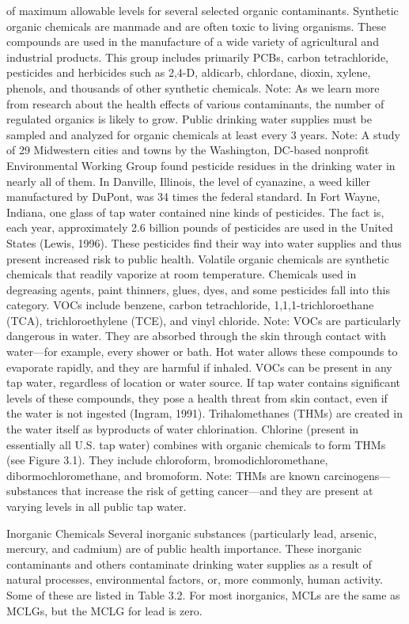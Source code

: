 \documentclass{article}
\begin{document}
of maximum allowable levels for several selected organic contaminants.
Synthetic organic chemicals are manmade and are often toxic to living
organisms. These compounds are used in the manufacture of a wide variety
of agricultural and industrial products. This group includes primarily
PCBs, carbon tetrachloride, pesticides and herbicides such as 2,4-D,
aldicarb, chlordane, dioxin, xylene, phenols, and thousands of other
synthetic chemicals. Note: As we learn more from research about the
health effects of various contaminants, the number of regulated organics
is likely to grow. Public drinking water supplies must be sampled and
analyzed for organic chemicals at least every 3 years. Note: A study of
29 Midwestern cities and towns by the Washington, DC-based nonprofit
Environmental Working Group found pesticide residues in the drinking
water in nearly all of them. In Danville, Illinois, the level of
cyanazine, a weed killer manufactured by DuPont, was 34 times the
federal standard. In Fort Wayne, Indiana, one glass of tap water
contained nine kinds of pesticides. The fact is, each year,
approximately 2.6 billion pounds of pesticides are used in the United
States (Lewis, 1996). These pesticides find their way into water
supplies and thus present increased risk to public health. Volatile
organic chemicals are synthetic chemicals that readily vaporize at room
temperature. Chemicals used in degreasing agents, paint thinners, glues,
dyes, and some pesticides fall into this category. VOCs include benzene,
carbon tetrachloride, 1,1,1-trichloroethane (TCA), trichloroethylene
(TCE), and vinyl chloride. Note: VOCs are particularly dangerous in
water. They are absorbed through the skin through contact with
water---for example, every shower or bath. Hot water allows these
compounds to evaporate rapidly, and they are harmful if inhaled. VOCs
can be present in any tap water, regardless of location or water source.
If tap water contains significant levels of these compounds, they pose a
health threat from skin contact, even if the water is not ingested
(Ingram, 1991). Trihalomethanes (THMs) are created in the water itself
as byproducts of water chlorination. Chlorine (present in essentially
all U.S. tap water) combines with organic chemicals to form THMs (see
Figure 3.1). They include chloroform, bromodichloromethane,
dibormochloromethane, and bromoform. Note: THMs are known
carcinogens---substances that increase the risk of getting cancer---and
they are present at varying levels in all public tap water.

Inorganic Chemicals Several inorganic substances (particularly lead,
arsenic, mercury, and cadmium) are of public health importance. These
inorganic contaminants and others contaminate drinking water supplies as
a result of natural processes, environmental factors, or, more commonly,
human activity. Some of these are listed in Table 3.2. For most
inorganics, MCLs are the same as MCLGs, but the MCLG for lead is zero.
\end{document}
